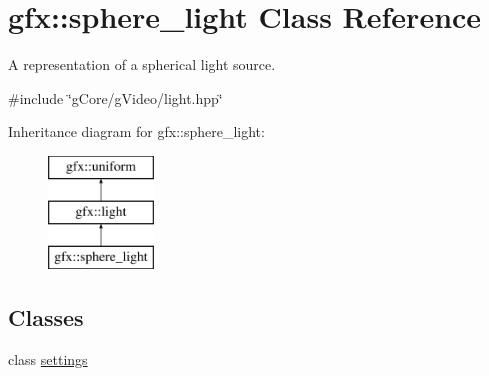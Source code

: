 \hypertarget{classgfx_1_1sphere__light}{\section{gfx\-:\-:sphere\-\_\-light Class Reference}
\label{classgfx_1_1sphere__light}
}


A representation of a spherical light source.  




{\ttfamily \#include \char`\"{}g\-Core/g\-Video/light.\-hpp\char`\"{}}

Inheritance diagram for gfx\-:\-:sphere\-\_\-light\-:\begin{figure}[H]
\begin{center}
\leavevmode
\includegraphics[height=3.000000cm]{classgfx_1_1sphere__light}
\end{center}
\end{figure}
\subsection*{Classes}
\begin{DoxyCompactItemize}
\item 
class \hyperlink{classgfx_1_1sphere__light_1_1settings}{settings}
\end{DoxyCompactItemize}
